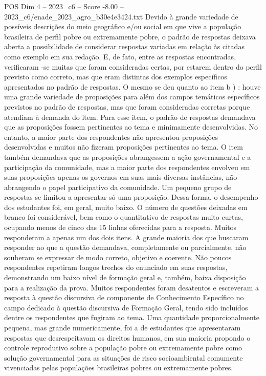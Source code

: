 \begin{textsample}{POS Dim 4 – 2023\_c6 – Score -8.00 – 2023\_c6/enade\_2023\_agro\_b30e4e3424.txt}
Devido à grande variedade de possíveis descrições do meio geográfico e/ou social em que vive a população brasileira de perfil pobre ou extremamente pobre, o padrão de respostas deixava aberta a possibilidade de considerar respostas variadas em relação às citadas como exemplo em sua redação.
E, de fato, entre as respostas encontradas, verificaram -se muitas que foram consideradas certas, por estarem dentro do perfil previsto como correto, mas que eram distintas dos exemplos específicos apresentados no padrão de respostas.
O mesmo se deu quanto ao item b ) : houve uma grande variedade de proposições para além dos campos temáticos específicos previstos no padrão de respostas, mas que foram consideradas corretas porque atendiam à demanda do item.
Para esse item, o padrão de respostas demandava que as proposições fossem pertinentes ao tema e minimamente desenvolvidas.
No entanto, a maior parte dos respondentes não apresentou proposições desenvolvidas e muitos não fizeram proposições pertinentes ao tema.
O item também demandava que as proposições abrangessem a ação governamental e a participação da comunidade, mas a maior parte dos respondentes envolveu em suas proposições apenas os governos em suas mais diversas instâncias, não abrangendo o papel participativo da comunidade.
Um pequeno grupo de respostas se limitou a apresentar só uma proposição.
Dessa forma, o desempenho dos estudantes foi, em geral, muito baixo.
O número de questões deixadas em branco foi considerável, bem como o quantitativo de respostas muito curtas, ocupando menos de cinco das 15 linhas oferecidas para a resposta.
Muitos responderam a apenas um dos dois itens.
A grande maioria dos que buscaram responder ao que a questão demandava, completamente ou parcialmente, não souberam se expressar de modo correto, objetivo e coerente.
Não poucos respondentes repetiram longos trechos do enunciado em suas respostas, demonstrando um baixo nível de formação geral e, também, baixa disposição para a realização da prova.
Muitos respondentes foram desatentos e escreveram a resposta à questão discursiva de componente de Conhecimento Específico no campo dedicado à questão discursiva de Formação Geral, tendo sido incluídos dentre os respondentes que fugiram ao tema.
Uma quantidade proporcionalmente pequena, mas grande numericamente, foi a de estudantes que apresentaram respostas que desrespeitavam os direitos humanos, em sua maioria propondo o controle reprodutivo sobre a população pobre ou extremamente pobre como solução governamental para as situações de risco socioambiental comumente vivenciadas pelas populações brasileiras pobres ou extremamente pobres.

\end{textsample}
